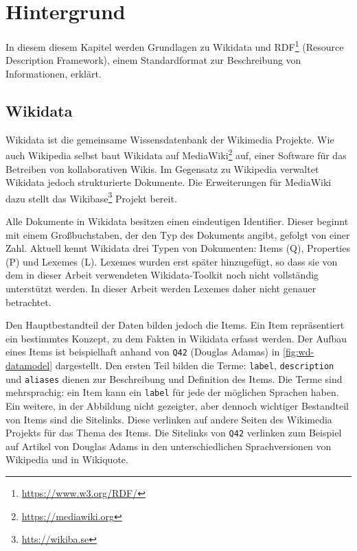 %
\chapter{Hintergrund}
\label{sec:concepts}
In diesem diesem Kapitel werden Grundlagen zu Wikidata und RDF\footnote{\url{https://www.w3.org/RDF/}} (Resource Description Framework), einem Standardformat zur Beschreibung von Informationen, erklärt. 

\section{Wikidata}
Wikidata ist die gemeinsame Wissensdatenbank der Wikimedia Projekte.
Wie auch Wikipedia selbst baut Wikidata auf MediaWiki\footnote{\url{https://mediawiki.org}} auf, einer Software für das Betreiben von kollaborativen Wikis.
Im Gegensatz zu Wikipedia verwaltet Wikidata jedoch strukturierte Dokumente.
Die Erweiterungen für MediaWiki dazu stellt das Wikibase\footnote{\url{htts://wikiba.se}} Projekt bereit.

Alle Dokumente in Wikidata besitzen einen eindeutigen Identifier.
Dieser beginnt mit einem Großbuchstaben, der den Typ des Dokuments angibt, gefolgt von einer Zahl.
Aktuell kennt Wikidata drei Typen von Dokumenten: Items (Q), Properties (P) und Lexemes (L).
Lexemes wurden erst später hinzugefügt, so dass sie von dem in dieser Arbeit verwendeten Wikidata-Toolkit noch nicht vollständig unterstützt werden.
In dieser Arbeit werden Lexemes daher nicht genauer betrachtet.

Den Hauptbestandteil der Daten bilden jedoch die Items.
Ein Item repräsentiert ein bestimmtes Konzept, zu dem Fakten in Wikidata erfasst werden.
Der Aufbau eines Items ist beispielhaft anhand von \verb|Q42| (Douglas Adamas) in \cref{fig:wd-datamodel} dargestellt.
Den ersten Teil bilden die Terme: \verb|label|, \verb|description| und \verb|aliases| dienen zur Beschreibung und Definition des Items.
Die Terme sind mehrsprachig: ein Item kann ein \verb|label| für jede der möglichen Sprachen haben.
Ein weitere, in der Abbildung nicht gezeigter, aber dennoch wichtiger Bestandteil von Items sind die Sitelinks.
Diese verlinken auf andere Seiten des Wikimedia Projekts für das Thema des Items.
Die Sitelinks von \verb|Q42| verlinken zum Beispiel auf Artikel von Douglas Adams in den unterschiedlichen Sprachversionen von Wikipedia und in Wikiquote.

